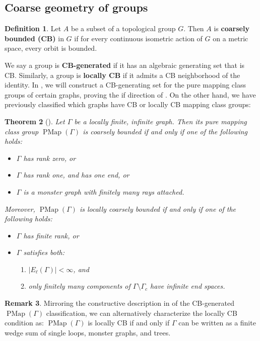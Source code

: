 \documentclass[11pt]{amsart}
\theoremstyle{plain}
\newtheorem{THM}{Theorem}[section]
\theoremstyle{definition}
\newtheorem{DEF}[THM]{Definition}
\newtheorem{RMK}[THM]{Remark}
\DeclareMathOperator{\PMap}{PMap}
\def\G{{\Gamma}}
\newcommand{\<}{\langle}
\renewcommand{\>}{\rangle}
\begin{document}
\subsection{Coarse geometry of groups}

\begin{DEF}
    Let $A$ be a subset of a topological group $G$. Then $A$ is \textbf{coarsely bounded (CB)} in $G$ if for every continuous isometric action of $G$ on a metric space, every orbit is bounded.
\end{DEF}

We say a group is \textbf{CB-generated} if it has an algebraic generating set that is CB. Similarly, a group is \textbf{locally CB} if it admits a CB neighborhood of the identity. In , we will construct a CB-generating set for the pure mapping class groups of certain graphs, proving the if direction of . On the other hand, we have previously classified which graphs have CB or locally CB mapping class groups: 

\begin{THM}[{\cite[Theorem A, D]{DHK2023}}]
\label{THM:CBclassification}
    Let $\G$ be a locally finite, infinite graph. Then its pure mapping class group $\PMap(\G)$ is \emph{coarsely bounded} if and only if one of the following holds:
    \begin{itemize}
        \item $\G$ has rank zero, or
        \item $\G$ has rank one, and has one end, or
        \item $\G$ is a monster graph with finitely many rays attached.
    \end{itemize}
    Moreover, $\PMap(\G)$ is \emph{locally coarsely bounded} if and only if one of the following holds:
        \begin{itemize}
        \item $\G$ has finite rank, or
        \item $\G$ satisfies both:
    \begin{enumerate}[label=\arabic*.]
            \item $|E_\ell(\G)| <\infty$, and
            \item only finitely many components of $\G \setminus \G_c$ have infinite end spaces.
        \end{enumerate}
    \end{itemize}
\end{THM}

\begin{RMK}
    Mirroring the constructive description in  of the CB-generated $\PMap(\G)$ classification, we can alternatively characterize the locally CB condition as: $\PMap(\G)$ is locally CB if and only if $\G$ can be written as a finite wedge sum of single loops, monster graphs, and trees. 
\end{RMK}
\end{document}
